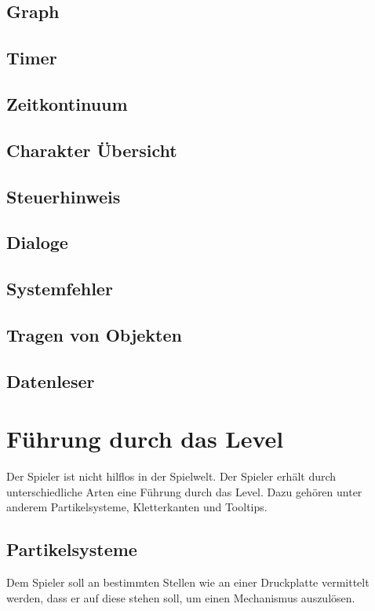 \subsection{Graph}
\subsection{Timer}\label{sec:user_timer}
\subsection{Zeitkontinuum}
\subsection{Charakter Übersicht}\label{sec:character-overview}
\subsection{Steuerhinweis}
\subsection{Dialoge}
\subsection{Systemfehler}
\subsection{Tragen von Objekten}
\subsection{Datenleser}\label{sec:datenleser_ui}
\section{Führung durch das Level}
Der Spieler ist nicht hilflos in der Spielwelt. Der Spieler erhält durch unterschiedliche Arten eine Führung durch das Level. Dazu gehören unter anderem Partikelsysteme, Kletterkanten und Tooltips.
\subsection{Partikelsysteme}\label{sec:particle-system}
Dem Spieler soll an bestimmten Stellen wie an einer Druckplatte vermittelt werden, dass er auf diese stehen soll, um einen Mechanismus auszulösen.

